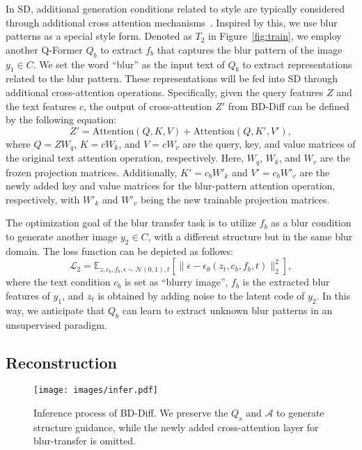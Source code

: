In SD, additional generation conditions related to style are typically considered through additional cross attention mechanisms~\cite{ye2023ip,chen2024artadapter}. Inspired by this, we use blur patterns as a special style form. Denoted as $T_2$ in Figure~\ref{fig:train}, we employ another Q-Former $Q_b$ to extract $f_b$ that captures the blur pattern of the image $y_1 \in C$. We set the word ``blur'' as the input text of $Q_b$ to extract representations related to the blur pattern. These representations will be fed into SD through additional cross-attention operations. Specifically, given the query features $Z$ and the text features $c$, the output of cross-attention $Z'$ from BD-Diff can be defined by the following equation:
\begin{equation}
Z' = \text{Attention}(Q, K, V) + \text{Attention}(Q, K', V'),
\end{equation}
where $Q = ZW_q$, $K = cW_k$, and $V = cW_v$ are the query, key, and value matrices of the original text attention operation, respectively. Here, $W_q$, $W_k$, and $W_v$ are the frozen projection matrices. Additionally, $K' = c_{b}W'_k$ and $V' = c_{b}W'_v$ are the newly added key and value matrices for the blur-pattern attention operation, respectively, with $W'_k$ and $W'_v$ being the new trainable projection matrices.

The optimization goal of the blur transfer task is to utilize $f_b$ as a blur condition to generate another image $y_2 \in C$, with a different structure but in the same blur domain. The loss function can be depicted as follows:
\begin{equation}
\label{eq:loss2}
\mathcal{L}_2 = 
\mathbb{E}_{z,c_b,f_b,\epsilon \sim \mathcal{N}(0,1),t} \left[ \| \epsilon - \epsilon_\theta (z_t, c_b, f_b, t) \|_2^2 \right], 
\end{equation}
where the text condition $c_b$ is set as ``blurry image'', $f_b$ is the extracted blur features of $y_1$, and $z_t$ is obtained by adding noise to the latent code of $y_2$. In this way, we anticipate that $Q_b$ can learn to extract unknown blur patterns in an unsupervised paradigm.

\subsection{Reconstruction}
\label{sec:task3}

\begin{figure}[t]
	\centering
	\texttt{[image: images/infer.pdf]}
	\caption{Inference process of BD-Diff. We preserve the $Q_s$ and $\mathcal{A}$ to generate structure guidance, while the newly added cross-attention layer for blur-transfer is omitted.}
	\label{fig:infer}
\end{figure}

